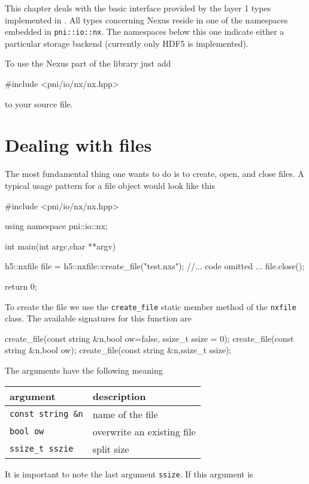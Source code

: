 
This chapter deals with the basic interface provided by the layer 1 types
implemented in \libpniio. All types concerning Nexus reside in one of the
namespaces embedded in {\tt pni::io::nx}. The namespaces below this one 
indicate either a particular storage backend (currently only HDF5 is
implemented).

To use the Nexus part of the library just add 
\begin{cppcode}
#include <pni/io/nx/nx.hpp>
\end{cppcode}
to your source file. 

\section{Dealing with files}
The most fundamental thing one wants to do is to create, open, and close files. 
A typical usage pattern for a file object would look like this
\begin{cppcode}
#include <pni/io/nx/nx.hpp>

using namespace pni::io::nx;

int main(int argc,char **argv)
{
    h5::nxfile file = h5::nxfile::create_file("test.nxs");
    //... code omitted ...
    file.close();

    return 0;
}
\end{cppcode}
To create the file we use the {\tt create\_file} static member method of the
{\tt nxfile} class. The available signatures for this function are
\begin{cppcode}
create_file(const string &n,bool ow=false, ssize_t ssize = 0);
create_file(const string &n,bool ow);
create_file(const string &n,ssize_t ssize);
\end{cppcode}
The arguments have the following meaning
\begin{center}
\begin{tabular}{l|l}
argument & description \\
\hline\hline
{\tt const string \&n} & name of the file \\
\hline
{\tt bool ow} & overwrite an existing file \\
\hline
{\tt ssize\_t sszie} & split size \\
\hline
\end{tabular}
\end{center}
It is important to note the last argument {\tt ssize}. If this argument is
